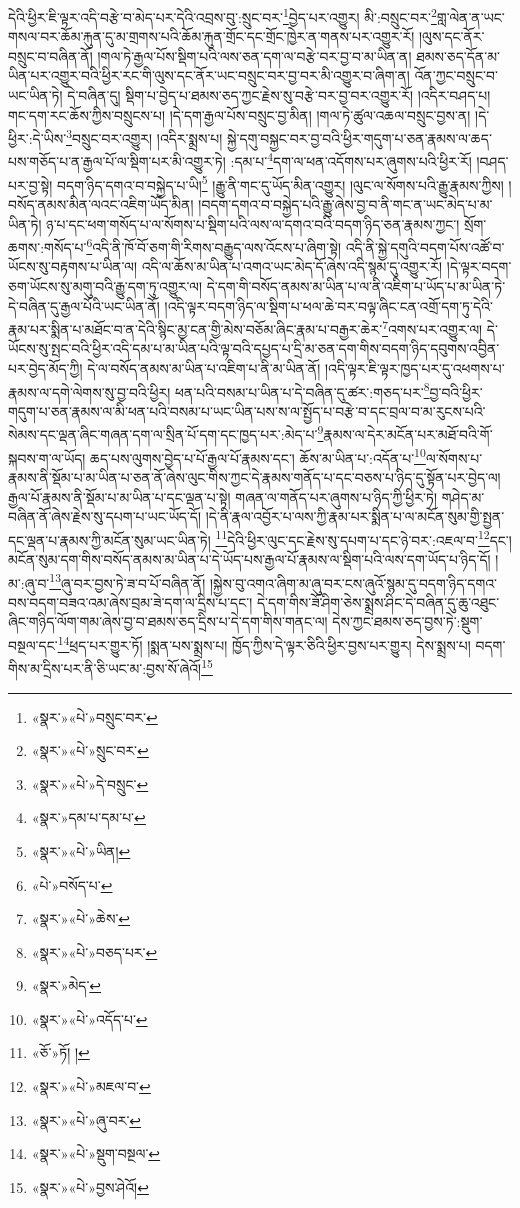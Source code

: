 དེའི་ཕྱིར་ཇི་ལྟར་འདི་བརྩེ་བ་མེད་པར་དེའི་འབྲས་བུ་:སྲུང་བར་\footnote{«སྣར་»«པེ་»བསྲུང་བར་}བྱེད་པར་འགྱུར། མི་:བསྲུང་བར་\footnote{«སྣར་»«པེ་»སྲུང་བར་}གླ་ལེན་ན་ཡང་གསལ་བར་ཆོམ་རྐུན་དུ་མ་གྲགས་པའི་ཆོམ་རྐུན་གྲོང་དང་གྲོང་ཁྱེར་ན་གནས་པར་འགྱུར་རོ། །ལུས་དང་ནོར་བསྲུང་བ་བཞིན་ནོ། །གལ་ཏེ་རྒྱལ་པོས་སྡིག་པའི་ལས་ཅན་དག་ལ་བརྩེ་བར་བྱ་བ་མ་ཡིན་ན། ཐམས་ཅད་དོན་མ་ཡིན་པར་འགྱུར་བའི་ཕྱིར་རང་གི་ལུས་དང་ནོར་ཡང་བསྲུང་བར་བྱ་བར་མི་འགྱུར་བ་ཞིག་ན། འོན་ཀྱང་བསྲུང་བ་ཡང་ཡིན་ཏེ། དེ་བཞིན་དུ། སྡིག་པ་བྱེད་པ་ཐམས་ཅད་ཀྱང་རྗེས་སུ་བརྩེ་བར་བྱ་བར་འགྱུར་རོ། །འདིར་བཤད་པ། གང་དག་རང་ཆོས་ཀྱིས་བསྲུངས་པ། །དེ་དག་རྒྱལ་པོས་བསྲུང་བྱ་མིན། །གལ་ཏེ་ཚུལ་འཆལ་བསྲུང་བྱས་ན། །དེ་ཕྱིར་:དེ་ཡིས་\footnote{«སྣར་»«པེ་»དེ་བསྲུང་}བསྲུང་བར་འགྱུར། །འདིར་སྨྲས་པ། སྐྱེ་དགུ་བསྐྱང་བར་བྱ་བའི་ཕྱིར་གདུག་པ་ཅན་རྣམས་ལ་ཆད་པས་གཅོད་པ་ན་རྒྱལ་པོ་ལ་སྡིག་པར་མི་འགྱུར་ཏེ། :དམ་པ་\footnote{«སྣར་»དམ་པ་དམ་པ་}དག་ལ་ཕན་འདོགས་པར་ཞུགས་པའི་ཕྱིར་རོ། །བཤད་པར་བྱ་སྟེ། བདག་ཉིད་དགའ་བ་བསྐྱེད་པ་ཡི།\footnote{«སྣར་»«པེ་»ཡིན།} །རྒྱུ་ནི་གང་དུ་ཡོད་མིན་འགྱུར། །ལུང་ལ་སོགས་པའི་རྒྱུ་རྣམས་ཀྱིས། །བསོད་ནམས་མིན་ལའང་འཇིག་ཡོད་མིན། །བདག་དགའ་བ་བསྐྱེད་པའི་རྒྱུ་ཞེས་བྱ་བ་ནི་གང་ན་ཡང་མེད་པ་མ་ཡིན་ཏེ། ཉ་པ་དང་ཕག་གསོད་པ་ལ་སོགས་པ་སྡིག་པའི་ལས་ལ་དགའ་བའི་བདག་ཉིད་ཅན་རྣམས་ཀྱང་། སྲོག་ཆགས་:གསོད་པ་\footnote{«པེ་»བསོད་པ་}འདི་ནི་ཁོ་བོ་ཅག་གི་རིགས་བརྒྱུད་ལས་འོངས་པ་ཞིག་སྟེ། འདི་ནི་སྐྱེ་དགུའི་བདག་པོས་འཚོ་བ་ཡོངས་སུ་བརྟགས་པ་ཡིན་ལ། འདི་ལ་ཆོས་མ་ཡིན་པ་འགའ་ཡང་མེད་དོ་ཞེས་འདི་སྙམ་དུ་འགྱུར་རོ། །དེ་ལྟར་བདག་ཅག་ཡོངས་སུ་མགུ་བའི་རྒྱུ་དག་ཏུ་འགྱུར་ལ། དེ་དག་གི་བསོད་ནམས་མ་ཡིན་པ་ལ་ནི་འཇིག་པ་ཡོད་པ་མ་ཡིན་ཏེ་དེ་བཞིན་དུ་རྒྱལ་པོའི་ཡང་ཡིན་ནོ། །འདི་ལྟར་བདག་ཉིད་ལ་སྡིག་པ་ཕལ་ཆེ་བར་བལྟ་ཞིང་ངན་འགྲོ་དག་ཏུ་དེའི་རྣམ་པར་སྨིན་པ་མཐོང་བ་ན་དེའི་སྙིང་མྱ་ངན་གྱི་མེས་བཅོམ་ཞིང་རྣམ་པ་བརྒྱར་ཆེར་\footnote{«སྣར་»«པེ་»ཆེས་}འགས་པར་འགྱུར་ལ། དེ་ཡོངས་སུ་སྤང་བའི་ཕྱིར་འདི་དམ་པ་མ་ཡིན་པའི་ལྟ་བའི་དཔྱད་པ་དྲི་མ་ཅན་དག་གིས་བདག་ཉིད་དབུགས་འབྱིན་པར་བྱེད་མོད་ཀྱི། དེ་ལ་བསོད་ནམས་མ་ཡིན་པ་འཇིག་པ་ནི་མ་ཡིན་ནོ། །འདི་ལྟར་ཇི་ལྟར་ཁྱད་པར་དུ་འཕགས་པ་རྣམས་ལ་དགེ་ལེགས་སུ་བྱ་བའི་ཕྱིར། ཕན་པའི་བསམ་པ་ཡིན་པ་དེ་བཞིན་དུ་ཚར་:གཅད་པར་\footnote{«སྣར་»«པེ་»བཅད་པར་}བྱ་བའི་ཕྱིར་གདུག་པ་ཅན་རྣམས་ལ་མི་ཕན་པའི་བསམ་པ་ཡང་ཡིན་པས་ས་ལ་སྤྱོད་པ་བརྩེ་བ་དང་བྲལ་བ་མ་རུངས་པའི་སེམས་དང་ལྡན་ཞིང་གཞན་དག་ལ་སྲིན་པོ་དག་དང་ཁྱད་པར་:མེད་པ་\footnote{«སྣར་»མེད་}རྣམས་ལ་དེར་མངོན་པར་མཐོ་བའི་གོ་སྐབས་ག་ལ་ཡོད། ཆད་པས་ལུགས་བྱེད་པ་པོ་རྒྱལ་པོ་རྣམས་དང་། ཆོས་མ་ཡིན་པ་:འདོན་པ་\footnote{«སྣར་»«པེ་»འདོད་པ་}ལ་སོགས་པ་རྣམས་ནི་སྡོམ་པ་མ་ཡིན་པ་ཅན་ནོ་ཞེས་ལུང་གིས་ཀྱང་དེ་རྣམས་གནོད་པ་དང་བཅས་པ་ཉིད་དུ་སྟོན་པར་བྱེད་ལ། རྒྱལ་པོ་རྣམས་ནི་སྡོམ་པ་མ་ཡིན་པ་དང་ལྡན་པ་སྟེ། གཞན་ལ་གནོད་པར་ཞུགས་པ་ཉིད་ཀྱི་ཕྱིར་ཏེ། གཤེད་མ་བཞིན་ནོ་ཞེས་རྗེས་སུ་དཔག་པ་ཡང་ཡོད་དོ། །དེ་ནི་རྣལ་འབྱོར་པ་ལས་ཀྱི་རྣམ་པར་སྨིན་པ་ལ་མངོན་སུམ་གྱི་སྤྱན་དང་ལྡན་པ་རྣམས་ཀྱི་མངོན་སུམ་ཡང་ཡིན་ཏེ། \footnote{«ཅོ་»ཏོ། ། }དེའི་ཕྱིར་ལུང་དང་རྗེས་སུ་དཔག་པ་དང་ཉེ་བར་:འཇལ་བ་\footnote{«སྣར་»«པེ་»མཇལ་བ་}དང་། མངོན་སུམ་དག་གིས་བསོད་ནམས་མ་ཡིན་པ་དེ་ཡོད་པས་རྒྱལ་པོ་རྣམས་ལ་སྡིག་པའི་ལས་དག་ཡོད་པ་ཉིད་དོ། །མ་:ཞུ་བ་\footnote{«སྣར་»«པེ་»ཞུ་བར་}ཞུ་བར་བྱས་ཏེ་ཟ་བ་པོ་བཞིན་ནོ། །སྐྱེས་བུ་འགའ་ཞིག་མ་ཞུ་བར་ངས་ཞུའོ་སྙམ་དུ་བདག་ཉིད་དགའ་བས་བདག་བཟའ་འམ་ཞེས་བྲམ་ཟེ་དག་ལ་དྲིས་པ་དང་། དེ་དག་གིས་ཟོ་ཤིག་ཅེས་སྨྲས་ཤིང་དེ་བཞིན་དུ་ཆུ་འཐུང་ཞིང་གཉིད་ལོག་གམ་ཞེས་བྱ་བ་ཐམས་ཅད་དྲིས་པ་དེ་དག་གིས་གནང་ལ། དེས་ཀྱང་ཐམས་ཅད་བྱས་ཏེ་:སྡུག་བསྔལ་དང་\footnote{«སྣར་»«པེ་»སྡུག་བསྔལ་}ཕྲད་པར་གྱུར་ཏོ། །སྨན་པས་སྨྲས་པ། ཁྱོད་ཀྱིས་དེ་ལྟར་ཅིའི་ཕྱིར་བྱས་པར་གྱུར། དེས་སྨྲས་པ། བདག་གིས་མ་དྲིས་པར་ནི་ཅི་ཡང་མ་:བྱས་སོ་ཞེའོ།\footnote{«སྣར་»«པེ་»བྱས་ཤེའོ།} 